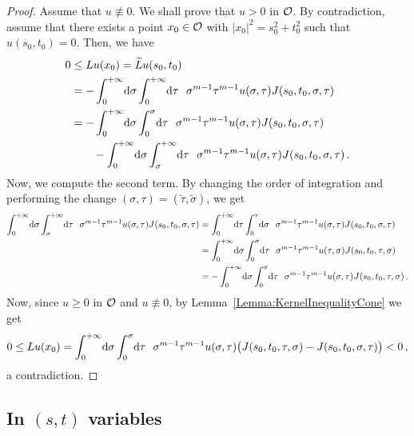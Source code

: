 \begin{proof}
Assume that $u \not \equiv 0$. We shall prove that $u > 0$ in $\mathcal{O}$. By contradiction, assume that there exists a point $x_0\in \mathcal{O}$ with $|x_0|^2 = s_0^2 + t_0^2$ such that $u(s_0, t_0)= 0$. Then, we have
\begin{align*}
0 &\leq Lu(x_0) = \widetilde{L} u (s_0,t_0) \\
&= - \int_0^{+\infty} \!\! \d \sigma \int_0^{+\infty} \!\! \d \tau \ \ \sigma^{m-1} \tau^{m-1} u(\sigma, \tau) J(s_0,t_0,\sigma, \tau)   \\
& = - \int_0^{+\infty}  \!\! \d \sigma \int_0^{\sigma}  \!\! \d \tau \ \ \sigma^{m-1} \tau^{m-1} u(\sigma, \tau) J(s_0,t_0,\sigma, \tau)   \\
& \quad \quad - \int_0^{+\infty}  \!\!  \d \sigma \int_{\sigma}^{+\infty} \!\!  \d \tau \ \ \sigma^{m-1} \tau^{m-1} u(\sigma, \tau) J(s_0,t_0,\sigma, \tau)\,.
\end{align*}
Now, we compute the second term. By changing the order of integration and performing the change $(\sigma,\tau) = (\tilde{\tau}, \tilde{\sigma})$, we get
\begin{align*}
\int_0^{+\infty} \!\!  \d \sigma \int_{\sigma}^{+\infty} \!\!  \d \tau \ \ \sigma^{m-1} \tau^{m-1} u(\sigma, \tau) J(s_0,t_0,\sigma, \tau) & =  \int_{0}^{+\infty}  \!\! \d \tau \int_0^{\tau}   \!\! \d \sigma \ \ \sigma^{m-1} \tau^{m-1} u(\sigma, \tau) J(s_0,t_0,\sigma, \tau)   \\
& =  \int_0^{+\infty}  \!\! \d \sigma \int_0^{\sigma}  \!\! \d \tau \ \ \sigma^{m-1} \tau^{m-1} u(\tau, \sigma) J(s_0,t_0,\tau, \sigma)   \\
& =  - \int_0^{+\infty}  \!\! \d \sigma \int_0^{\sigma}  \!\! \d \tau \ \ \sigma^{m-1} \tau^{m-1} u( \sigma, \tau) J(s_0,t_0,\tau, \sigma) \,.  \\
\end{align*}
Now, since $u\geq 0$ in $\mathcal{O}$ and $u \not \equiv 0$, by Lemma~\ref{Lemma:KernelInequalityCone} we get
$$
0 \leq Lu(x_0) = \int_0^{+\infty}  \!\! \d \sigma \int_0^{\sigma}  \!\! \d \tau \ \ \sigma^{m-1} \tau^{m-1} u(\sigma, \tau) \big( J(s_0,t_0,\tau, \sigma) - J(s_0,t_0,\sigma, \tau)   \big ) < 0\,,
$$
a contradiction.
\end{proof}


\subsection{In $(s,t)$ variables}


